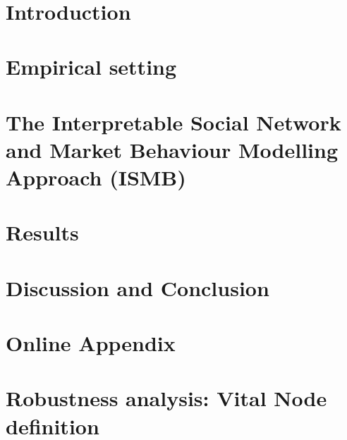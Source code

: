 \documentclass[11pt,a4paper,rorate,times]{article}
\begin{document}
		\vspace{0.2cm}
\\[ 0.2cm]

\newpage
\section{Introduction}
\label{sec:intro}


%

\section{Empirical setting}
\label{sec:data_desc}


\section{The Interpretable Social Network and Market Behaviour Modelling Approach (ISMB)}
\label{sec:method}


\section{Results}
\label{sec:results}


\section{Discussion and Conclusion}
\label{sec:conclusion}


\newpage


%

\printbibliography




\newpage

\section*{Online Appendix}
\label{appendix}
\appendix
{}
\FloatBarrier
\section{Robustness analysis: Vital Node definition}
\label{app:vnrobust}

\end{document}
